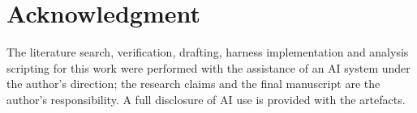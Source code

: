 \documentclass[conference]{IEEEtran}
\begin{document}
\section*{Acknowledgment}

The literature search, verification, drafting, harness implementation and analysis scripting for this
work were performed with the assistance of an AI system under the author's direction; the research
claims and the final manuscript are the author's responsibility. A full disclosure of AI use is
provided with the artefacts.



\end{document}
